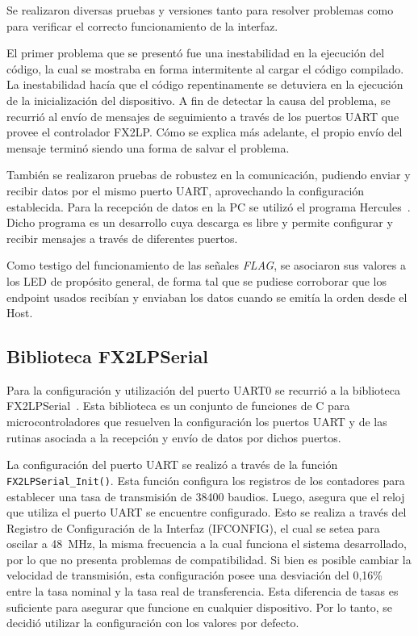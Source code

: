 
Se realizaron diversas pruebas y versiones tanto para resolver problemas como para verificar el correcto funcionamiento de la interfaz.

El primer problema que se presentó fue una inestabilidad en la ejecución del código, la cual se mostraba en forma intermitente al cargar el código compilado. La inestabilidad hacía que el código repentinamente se detuviera en la ejecución de la inicialización del dispositivo. A fin de detectar la causa del problema, se recurrió al envío de mensajes de seguimiento a través de los puertos UART que provee el controlador FX2LP. Cómo se explica más adelante, el propio envío del mensaje terminó siendo una forma de salvar el problema.

También se realizaron pruebas de robustez en la comunicación, pudiendo enviar y recibir datos por el mismo puerto UART, aprovechando la configuración establecida. Para la recepción de datos en la PC se utilizó el programa Hercules~\cite{HWGroup}. Dicho programa es un desarrollo cuya descarga es libre y permite configurar y recibir mensajes a través de diferentes puertos.

Como testigo del funcionamiento de las señales \textit{FLAG}, se asociaron sus valores a los LED de propósito general, de forma tal que se pudiese corroborar que los endpoint usados recibían y enviaban los datos cuando se emitía la orden desde el Host.

\subsection{Biblioteca FX2LPSerial}
Para la configuración y utilización del puerto UART0 se recurrió a la biblioteca FX2LPSerial~\cite{Kumar2017}. Esta biblioteca es un conjunto de funciones de C para microcontroladores que resuelven la configuración los puertos UART y de las rutinas asociada a la recepción y envío de datos por dichos puertos. 

La configuración del puerto UART se realizó a través de la función \verb|FX2LPSerial_Init()|. Esta función configura los registros de los contadores para establecer una tasa de transmisión de 38400 baudios. Luego, asegura que el reloj que utiliza el puerto UART se encuentre configurado. Esto se realiza a través del Registro de Configuración de la Interfaz (IFCONFIG), el cual se setea para oscilar a \SI{48}{\mega\hertz}, la misma frecuencia a la cual funciona el sistema desarrollado, por lo que no presenta problemas de compatibilidad. Si bien es posible cambiar la velocidad de transmisión, esta configuración posee una desviación del 0,16\%~\cite{CypressSemiconductor2014fx2lp} entre la tasa nominal y la tasa real de transferencia. Esta diferencia de tasas es suficiente para asegurar que funcione en cualquier dispositivo. Por lo tanto, se decidió utilizar la configuración con los valores por defecto.

